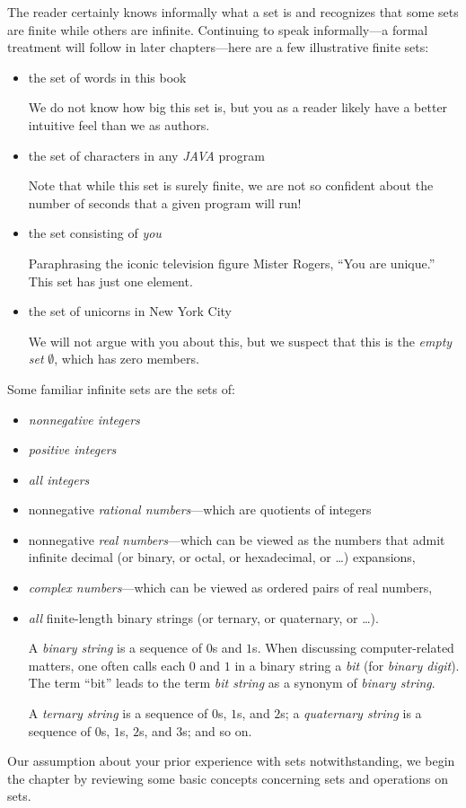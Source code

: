 The reader certainly knows informally what a set is and recognizes that some sets are finite while others are infinite.  Continuing to speak informally---a formal treatment will follow in later
chapters---here are a few illustrative finite sets:
\begin{itemize}
\item
the set of words in this book

\smallskip

We do not know how big this set is, but you as a reader likely have a better intuitive feel than we as authors.
\item
the set of characters in any {\it JAVA} program

\smallskip

Note that while this set is surely finite, we are not so confident about the number of seconds that a given program will run!
\item
the set consisting of {\em you}

\smallskip

Paraphrasing the iconic television figure Mister Rogers, ``You are unique.''  This set has just one element.
\item
the set of unicorns in New York City

\smallskip

We will not argue with you about this, but we suspect that this is the {\em empty set} $\emptyset$, which has zero members.
\end{itemize}
Some familiar infinite sets are the sets of:
\begin{itemize}
\item
{\em nonnegative integers}
\item
{\em positive integers}
\item
{\em all integers}
\item
nonnegative {\em rational numbers}---which are quotients of integers
\item
nonnegative {\em real numbers}---which can be viewed as the numbers that admit infinite decimal (or binary, or octal, or hexadecimal, or \ldots) expansions,
\item
{\em complex numbers}---which can be viewed as ordered pairs of real numbers,
\item
{\em all} finite-length binary strings (or ternary, or quaternary, or \ldots).

\smallskip

  
A {\it binary string} is a sequence of $0$s and $1$s.  When discussing computer-related matters, one often calls each $0$ and $1$ in a binary string a {\it bit} (for {\it binary digit}).  The term ``bit'' leads to the term {\it bit string} as a synonym of {\it binary string}.

  
A {\it ternary string} is a sequence of $0$s, $1$s, and $2$s; a {\it quaternary string} is a sequence of $0$s, $1$s, $2$s, and $3$s; and so on.
\end{itemize}
Our assumption about your prior experience with sets notwithstanding, we begin the chapter by reviewing some basic concepts concerning sets and operations on sets.

